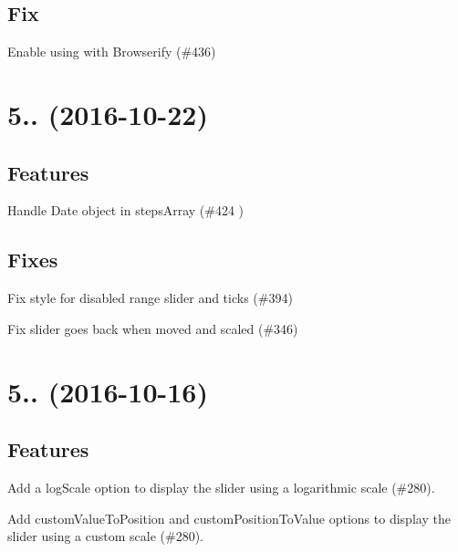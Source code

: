 \subsection*{Fix}


\begin{DoxyItemize}
\item Enable using with Browserify (\#436)
\end{DoxyItemize}

\section*{5.. (2016-\/10-\/22)}

\subsection*{Features}


\begin{DoxyItemize}
\item Handle Date object in steps\+Array (\#424 )
\end{DoxyItemize}

\subsection*{Fixes}


\begin{DoxyItemize}
\item Fix style for disabled range slider and ticks (\#394)
\item Fix slider goes back when moved and scaled (\#346)
\end{DoxyItemize}

\section*{5.. (2016-\/10-\/16)}

\subsection*{Features}


\begin{DoxyItemize}
\item Add a {\ttfamily log\+Scale} option to display the slider using a logarithmic scale (\#280).
\item Add {\ttfamily custom\+Value\+To\+Position} and {\ttfamily custom\+Position\+To\+Value} options to display the slider using a custom scale (\#280).
\end{DoxyItemize}

